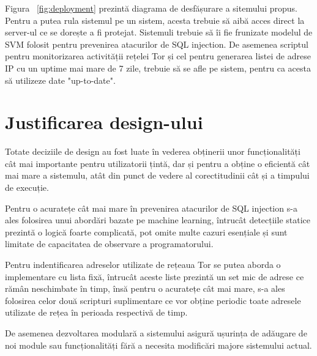 Figura ~\ref{fig:deployment}  prezintă diagrama de desfășurare a sitemului propus.  \\
Pentru a putea rula sistemul \textit{\thesistitle}  pe un sistem, acesta trebuie să aibă acces direct la server-ul ce se dorește a fi protejat. Sistemuli trebuie să îi fie frunizate modelul de SVM folosit pentru prevenirea atacurilor de SQL injection. De asemenea scriptul pentru monitorizarea activității rețelei Tor și cel pentru generarea listei de adrese IP cu un uptime mai mare de 7 zile, trebuie să se afle pe sistem, pentru ca acesta să utilizeze date "up-to-date". 

\section{Justificarea design-ului}
 

 Totate deciziile de design au fost luate în vederea obținerii unor funcționalități cât mai importante pentru utilizatorii țintă, dar și pentru a obține o eficientă cât mai mare a sistemulu, atât din punct de vedere al corectitudinii cât și a timpului de execuție. 


Pentru o acuratețe cât mai mare în prevenirea atacurilor de SQL injection s-a ales folosirea unui abordări bazate pe machine learning, întrucât detecțiile statice prezintă o logică foarte complicată, pot omite multe cazuri esențiale și sunt limitate de capacitatea de observare a programatorului.  


Pentru indentificarea adreselor utilizate de rețeaua Tor se putea aborda o implementare cu lista fixă, întrucât aceste liste prezintă un set mic de adrese ce rămân neschimbate în timp, însă pentru o acuratețe cât mai mare, s-a ales folosirea celor două scripturi suplimentare ce vor obține periodic toate adresele utilizate de rețea în perioada respectivă de timp. 


De asemenea dezvoltarea modulară a sistemului asigură ușurința de adăugare de noi module sau funcționalități fără a necesita modificări majore sistemului actual. 

